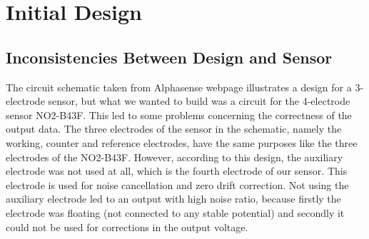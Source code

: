 \section{Initial Design}

\subsection{Inconsistencies Between Design and Sensor}
The circuit schematic taken from Alphasense webpage \cite{2009} illustrates a design for a 3-electrode sensor, but what we wanted to build was a circuit for the 4-electrode sensor NO2-B43F. This led to some problems concerning the correctness of the output data. The three electrodes of the sensor in the schematic, namely the working, counter and reference electrodes, have the same purposes like the three electrodes of the NO2-B43F. However, according to this design, the auxiliary electrode was not used at all, which is the fourth electrode of our sensor. This electrode is used for noise cancellation and zero drift correction. Not using the auxiliary electrode led to an output with high noise ratio, because firstly the electrode was floating (not connected to any stable potential) and secondly it could not be used for corrections in the output voltage. 

